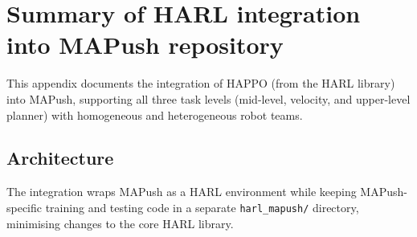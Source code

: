 \section{Summary of HARL integration into MAPush repository}
\label{app:harl_integration}

This appendix documents the integration of HAPPO (from the HARL library)
into MAPush, supporting all three task levels (mid-level, velocity, and
upper-level planner) with homogeneous and heterogeneous robot teams.

\subsection{Architecture}

The integration wraps MAPush as a HARL environment while keeping
MAPush-specific training and testing code in a separate
\texttt{harl\_mapush/} directory, minimising changes to the core HARL
library.

